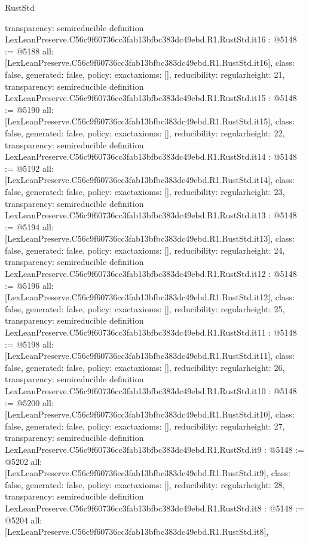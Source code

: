 \begin{lexlean}{RustStd}
\begin{coremodule}
{  transparency: semireducible
}
definition LexLeanPreserve.C56c9f60736cc3fab13bfbc383dc49ebd.R1.RustStd.it16 : @5148 := @5188 {
  all: [LexLeanPreserve.C56c9f60736cc3fab13bfbc383dc49ebd.R1.RustStd.it16],
  class: false,
  generated: false,
  policy: exact{axioms: []},
  reducibility: regular{height: 21},
  transparency: semireducible
}
definition LexLeanPreserve.C56c9f60736cc3fab13bfbc383dc49ebd.R1.RustStd.it15 : @5148 := @5190 {
  all: [LexLeanPreserve.C56c9f60736cc3fab13bfbc383dc49ebd.R1.RustStd.it15],
  class: false,
  generated: false,
  policy: exact{axioms: []},
  reducibility: regular{height: 22},
  transparency: semireducible
}
definition LexLeanPreserve.C56c9f60736cc3fab13bfbc383dc49ebd.R1.RustStd.it14 : @5148 := @5192 {
  all: [LexLeanPreserve.C56c9f60736cc3fab13bfbc383dc49ebd.R1.RustStd.it14],
  class: false,
  generated: false,
  policy: exact{axioms: []},
  reducibility: regular{height: 23},
  transparency: semireducible
}
definition LexLeanPreserve.C56c9f60736cc3fab13bfbc383dc49ebd.R1.RustStd.it13 : @5148 := @5194 {
  all: [LexLeanPreserve.C56c9f60736cc3fab13bfbc383dc49ebd.R1.RustStd.it13],
  class: false,
  generated: false,
  policy: exact{axioms: []},
  reducibility: regular{height: 24},
  transparency: semireducible
}
definition LexLeanPreserve.C56c9f60736cc3fab13bfbc383dc49ebd.R1.RustStd.it12 : @5148 := @5196 {
  all: [LexLeanPreserve.C56c9f60736cc3fab13bfbc383dc49ebd.R1.RustStd.it12],
  class: false,
  generated: false,
  policy: exact{axioms: []},
  reducibility: regular{height: 25},
  transparency: semireducible
}
definition LexLeanPreserve.C56c9f60736cc3fab13bfbc383dc49ebd.R1.RustStd.it11 : @5148 := @5198 {
  all: [LexLeanPreserve.C56c9f60736cc3fab13bfbc383dc49ebd.R1.RustStd.it11],
  class: false,
  generated: false,
  policy: exact{axioms: []},
  reducibility: regular{height: 26},
  transparency: semireducible
}
definition LexLeanPreserve.C56c9f60736cc3fab13bfbc383dc49ebd.R1.RustStd.it10 : @5148 := @5200 {
  all: [LexLeanPreserve.C56c9f60736cc3fab13bfbc383dc49ebd.R1.RustStd.it10],
  class: false,
  generated: false,
  policy: exact{axioms: []},
  reducibility: regular{height: 27},
  transparency: semireducible
}
definition LexLeanPreserve.C56c9f60736cc3fab13bfbc383dc49ebd.R1.RustStd.it9 : @5148 := @5202 {
  all: [LexLeanPreserve.C56c9f60736cc3fab13bfbc383dc49ebd.R1.RustStd.it9],
  class: false,
  generated: false,
  policy: exact{axioms: []},
  reducibility: regular{height: 28},
  transparency: semireducible
}
definition LexLeanPreserve.C56c9f60736cc3fab13bfbc383dc49ebd.R1.RustStd.it8 : @5148 := @5204 {
  all: [LexLeanPreserve.C56c9f60736cc3fab13bfbc383dc49ebd.R1.RustStd.it8],
}
\end{coremodule}
\end{lexlean}
